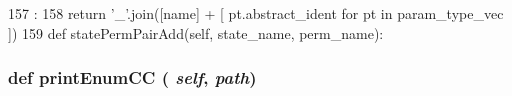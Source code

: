 \begin{DoxyCode}
157                                                     :
158         return '_'.join([name] + [ pt.abstract_ident for pt in param_type_vec ])
159 
    def statePermPairAdd(self, state_name, perm_name):
\end{DoxyCode}
\hypertarget{classslicc_1_1symbols_1_1Type_1_1Type_a6c3213bf8871a93a4a2dc1baef9bd3fd}{
\subsubsection[{printEnumCC}]{\setlength{\rightskip}{0pt plus 5cm}def printEnumCC ( {\em self}, \/   {\em path})}}
\label{classslicc_1_1symbols_1_1Type_1_1Type_a6c3213bf8871a93a4a2dc1baef9bd3fd}



